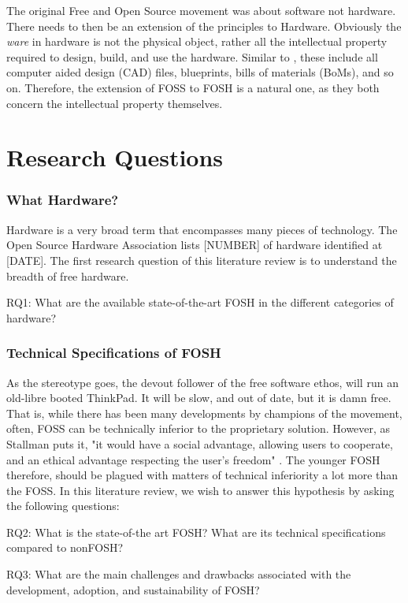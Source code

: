 \documentclass{article}
\begin{document}
The original Free and Open Source movement was about software not hardware.
There needs to then be an extension of the principles to Hardware.
Obviously the \textit{ware} in hardware is not the physical object, rather all the intellectual property required to design, build, and use the hardware. 
Similar to \cite{p1_def_succ}, these include all computer aided design (CAD) files, blueprints, bills of materials (BoMs), and so on. 
Therefore, the extension of FOSS to FOSH is a natural one, as they both concern the intellectual property themselves. 

\section{Research Questions}
\subsubsection{What Hardware?}
\label{RQ1}
Hardware is a very broad term that encompasses many pieces of technology.
The Open Source Hardware Association lists [NUMBER] of hardware identified at [DATE].
The first research question of this literature review is to understand the breadth of free hardware.

RQ1: What are the available state-of-the-art FOSH in the different categories of hardware?

\subsubsection{Technical Specifications of FOSH}
As the stereotype goes, the devout follower of the free software ethos, will run an old-libre booted ThinkPad.
It will be slow, and out of date, but it is damn free. 
That is, while there has been many developments by champions of the movement, often, FOSS can be technically inferior to the proprietary solution. 
However, as Stallman puts it, "it would have a social advantage, allowing users to cooperate, and an ethical advantage respecting the user's freedom" \cite{b0_stallman}.
The younger FOSH therefore, should be plagued with matters of technical inferiority a lot more than the FOSS. 
In this literature review, we wish to answer this hypothesis by asking the following questions:

RQ2: What is the state-of-the art FOSH? What are its technical specifications compared to nonFOSH? 

RQ3: What are the main challenges and drawbacks associated with the development, adoption, and sustainability of FOSH?
\end{document}
